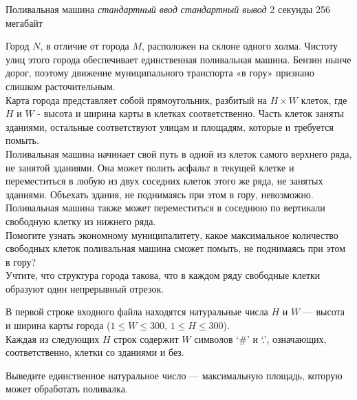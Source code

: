 \begin{problem}%
{Поливальная машина}%
{\textsl{стандартный ввод}}%
{\textsl{стандартный вывод}}%
{2 секунды}%
{256 мегабайт}{}

Город $N$, в отличие от города $M$, расположен на склоне одного холма. Чистоту улиц этого города обеспечивает единственная поливальная машина. Бензин нынче дорог, поэтому движение муниципального транспорта «в гору» признано слишком расточительным.\\

Карта города представляет собой прямоугольник, разбитый на $H \times W$ клеток, где $H$ и $W$ - высота и ширина карты в клетках соответственно. Часть клеток заняты зданиями, остальные соответствуют улицам и площадям, которые и требуется помыть.\\

Поливальная машина начинает свой путь в одной из клеток самого верхнего ряда, не занятой зданиями. Она может полить асфальт в текущей клетке и переместиться в любую из двух соседних клеток этого же ряда, не занятых зданиями. Объехать здания, не поднимаясь при этом в гору, невозможно. Поливальная машина также может переместиться в соседнюю по вертикали свободную клетку из нижнего ряда.\\

Помогите узнать экономному муниципалитету, какое максимальное количество свободных клеток поливальная машина сможет помыть, не поднимаясь при этом в гору?\\

Учтите, что структура города такова, что в каждом ряду свободные клетки образуют один непрерывный отрезок.

\InputFile

В первой строке входного файла находятся натуральные числа $H$ и $W$ — высота и ширина карты города ($1 \le W \le 300$, $1 \le H \le 300$).\\

Каждая из следующих $H$ строк содержит $W$ символов ‘\#’ и ‘.’, означающих, соответственно, клетки со зданиями и без.

\OutputFile

Выведите единственное натуральное число — максимальную площадь, которую может обработать поливалка.

\Examples

\begin{example}
%
\end{example}
\end{problem}